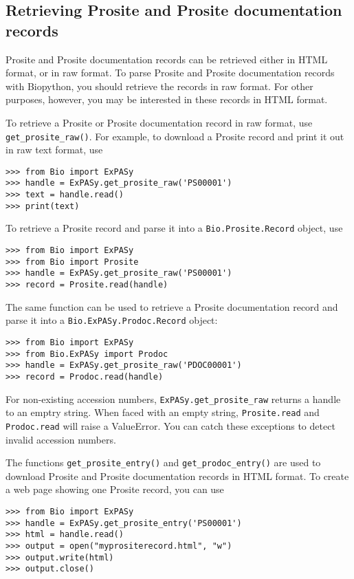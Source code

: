 \documentclass{report}
\begin{document}
\subsection{Retrieving Prosite and Prosite documentation records}

Prosite and Prosite documentation records can be retrieved either in HTML format, or in raw format. To parse Prosite and Prosite documentation records with Biopython, you should retrieve the records in raw format. For other purposes, however, you may be interested in these records in HTML format.

To retrieve a Prosite or Prosite documentation record in raw format, use \verb|get_prosite_raw()|. For example, to download a Prosite record and print it out in raw text format, use

\begin{verbatim}
>>> from Bio import ExPASy
>>> handle = ExPASy.get_prosite_raw('PS00001')
>>> text = handle.read()
>>> print(text)
\end{verbatim}

To retrieve a Prosite record and parse it into a \verb|Bio.Prosite.Record| object, use

\begin{verbatim}
>>> from Bio import ExPASy
>>> from Bio import Prosite
>>> handle = ExPASy.get_prosite_raw('PS00001')
>>> record = Prosite.read(handle)
\end{verbatim}

The same function can be used to retrieve a Prosite documentation record and parse it into a \verb|Bio.ExPASy.Prodoc.Record| object:

\begin{verbatim}
>>> from Bio import ExPASy
>>> from Bio.ExPASy import Prodoc
>>> handle = ExPASy.get_prosite_raw('PDOC00001')
>>> record = Prodoc.read(handle)
\end{verbatim}

For non-existing accession numbers, \verb|ExPASy.get_prosite_raw| returns a handle to an emptry string. When faced with an empty string, \verb|Prosite.read| and \verb|Prodoc.read| will raise a ValueError. You can catch these exceptions to detect invalid accession numbers.

The functions \verb|get_prosite_entry()| and \verb|get_prodoc_entry()| are used to download Prosite and Prosite documentation records in HTML format. To create a web page showing one Prosite record, you can use

\begin{verbatim}
>>> from Bio import ExPASy
>>> handle = ExPASy.get_prosite_entry('PS00001')
>>> html = handle.read()
>>> output = open("myprositerecord.html", "w")
>>> output.write(html)
>>> output.close()
\end{verbatim}
\end{document}
